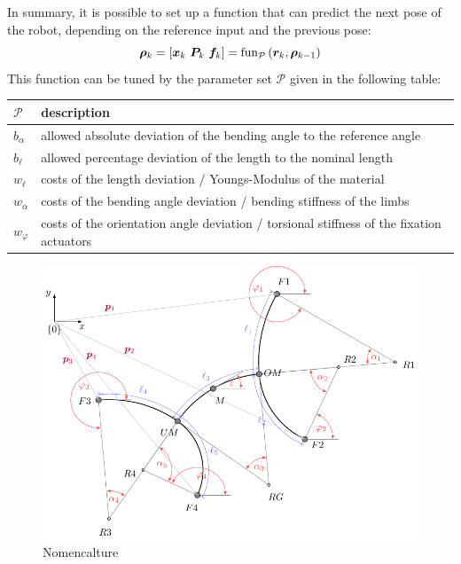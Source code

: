 \documentclass[10pt,a4paper]{article}
\begin{document}
In summary, it is possible to set up a function that can predict the next pose of the robot, depending on the reference input and the previous pose:
\begin{equation}
\bm{\rho}_k = [\bm{x}_k~\bm{P}_k~\bm{f}_k] = \textnormal{fun}_{\mathcal{P}}\left( \bm{r}_k, \bm{\rho}_{k-1} \right)
\end{equation}
This function can be tuned by the parameter set $\mathcal{P}$ given in the following table:
\begin{center}
\begin{tabular}{l|l}
$\mathcal{P}$ & description \\
\hline
$b_\alpha$ & allowed absolute deviation of the bending angle to the reference angle \\
$b_\ell$ & allowed percentage deviation of the length to the nominal length \\
$w_\ell$ & costs of the length deviation / Youngs-Modulus of the material \\
$w_\alpha$ & costs of the bending angle deviation / bending stiffness of the limbs\\
$w_\varphi$ & costs of the orientation angle deviation / torsional stiffness of the fixation actuators\\
\end{tabular}
\end{center}



\begin{figure}
\centering\includegraphics[scale=1]{../Pics/model/model.pdf}
\caption{Nomencalture}
\label{fig:model}
\end{figure}
\end{document}
